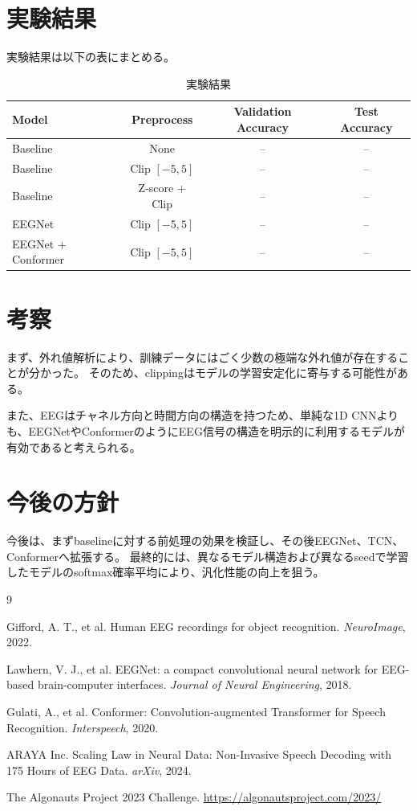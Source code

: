 \documentclass[a4paper,11pt]{jsarticle}
\begin{document}
\section{実験結果}

実験結果は以下の表にまとめる。

\begin{table}[h]
\centering
\caption{実験結果}
\begin{tabular}{lccc}
\toprule
Model & Preprocess & Validation Accuracy & Test Accuracy \\
\midrule
Baseline & None & -- & -- \\
Baseline & Clip $[-5,5]$ & -- & -- \\
Baseline & Z-score + Clip & -- & -- \\
EEGNet & Clip $[-5,5]$ & -- & -- \\
EEGNet + Conformer & Clip $[-5,5]$ & -- & -- \\
\bottomrule
\end{tabular}
\end{table}

\section{考察}

まず、外れ値解析により、訓練データにはごく少数の極端な外れ値が存在することが分かった。
そのため、clippingはモデルの学習安定化に寄与する可能性がある。

また、EEGはチャネル方向と時間方向の構造を持つため、単純な1D CNNよりも、EEGNetやConformerのようにEEG信号の構造を明示的に利用するモデルが有効であると考えられる。

\section{今後の方針}

今後は、まずbaselineに対する前処理の効果を検証し、その後EEGNet、TCN、Conformerへ拡張する。
最終的には、異なるモデル構造および異なるseedで学習したモデルのsoftmax確率平均により、汎化性能の向上を狙う。

\begin{thebibliography}{9}

Gifford, A. T., et al.
Human EEG recordings for object recognition.
\textit{NeuroImage}, 2022.

Lawhern, V. J., et al.
EEGNet: a compact convolutional neural network for EEG-based brain-computer interfaces.
\textit{Journal of Neural Engineering}, 2018.

Gulati, A., et al.
Conformer: Convolution-augmented Transformer for Speech Recognition.
\textit{Interspeech}, 2020.

ARAYA Inc.
Scaling Law in Neural Data: Non-Invasive Speech Decoding with 175 Hours of EEG Data.
\textit{arXiv}, 2024.

The Algonauts Project 2023 Challenge.
\url{https://algonautsproject.com/2023/}

\end{thebibliography}
\end{document}
